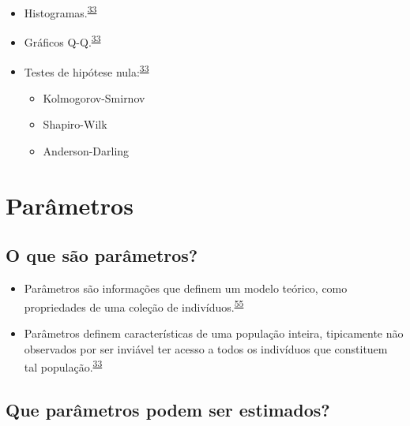 \documentclass[
  a4paper,
]{book}
\begin{document}
\begin{itemize}
\item
  Histogramas.\textsuperscript{\protect\hyperlink{ref-vetter2017}{33}}
\item
  Gráficos Q-Q.\textsuperscript{\protect\hyperlink{ref-vetter2017}{33}}
\item
  Testes de hipótese nula:\textsuperscript{\protect\hyperlink{ref-vetter2017}{33}}

  \begin{itemize}
  \item
    Kolmogorov-Smirnov
  \item
    Shapiro-Wilk
  \item
    Anderson-Darling
  \end{itemize}
\end{itemize}

\hypertarget{parametros}{%
\section{Parâmetros}\label{parametros}}

\hypertarget{o-que-suxe3o-paruxe2metros}{%
\subsection{O que são parâmetros?}\label{o-que-suxe3o-paruxe2metros}}

\begin{itemize}
\item
  Parâmetros são informações que definem um modelo teórico, como propriedades de uma coleção de indivíduos.\textsuperscript{\protect\hyperlink{ref-Altman1999}{55}}
\item
  Parâmetros definem características de uma população inteira, tipicamente não observados por ser inviável ter acesso a todos os indivíduos que constituem tal população.\textsuperscript{\protect\hyperlink{ref-vetter2017}{33}}
\end{itemize}

\hypertarget{que-paruxe2metros-podem-ser-estimados}{%
\subsection{Que parâmetros podem ser estimados?}\label{que-paruxe2metros-podem-ser-estimados}}
\end{document}
